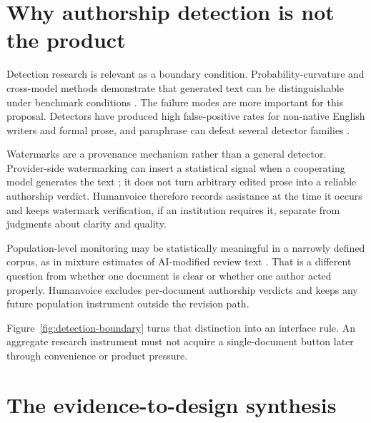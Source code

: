 \section{Why authorship detection is not the product}

Detection research is relevant as a boundary condition. Probability-curvature
and cross-model methods demonstrate that generated text can be distinguishable
under benchmark conditions
\citep{gehrmann2019gltr,mitchell2023detectgpt,bao2024fastdetect,hans2024binoculars}.
The failure modes are more important for this proposal. Detectors have produced
high false-positive rates for non-native English writers and formal prose, and
paraphrase can defeat several detector families
\citep{liang2023detectors,weberwulff2023testing,krishna2023paraphrasing,
sadasivan2024reliably}.

Watermarks are a provenance mechanism rather than a general detector.
Provider-side watermarking can insert a statistical signal when a cooperating
model generates the text \citep{kirchenbauer2023watermark}; it does not turn
arbitrary edited prose into a reliable authorship verdict. Humanvoice therefore
records assistance at the time it occurs and keeps watermark verification, if
an institution requires it, separate from judgments about clarity and quality.

Population-level monitoring may be statistically meaningful in a narrowly
defined corpus, as in mixture estimates of AI-modified review text
\citep{liang2024monitoring}. That is a different question from whether one
document is clear or whether one author acted properly. Humanvoice excludes
per-document authorship verdicts and keeps any future population instrument
outside the revision path.

Figure~\ref{fig:detection-boundary} turns that distinction into an interface
rule. An aggregate research instrument must not acquire a single-document
button later through convenience or product pressure.

\hvFigureDetectionBoundary

\section{The evidence-to-design synthesis}

